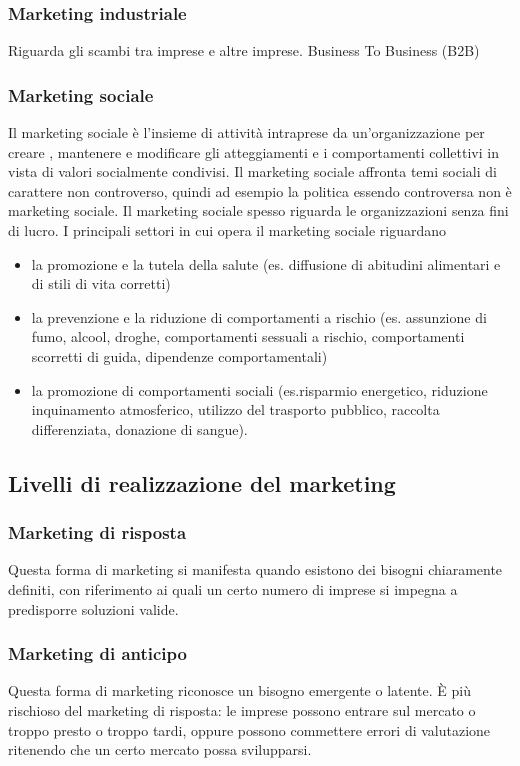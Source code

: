 \subsubsection*{Marketing industriale} 
Riguarda gli scambi tra imprese e altre imprese. Business To Business (B2B)
\subsubsection*{Marketing sociale}
Il marketing sociale è l’insieme di attività intraprese da un’organizzazione per creare , mantenere e modificare gli atteggiamenti e i comportamenti collettivi in vista di valori socialmente condivisi. \newline
Il marketing sociale affronta temi sociali di carattere non controverso, quindi ad esempio la politica essendo controversa non è marketing sociale. \newline
Il marketing sociale spesso riguarda le organizzazioni senza fini di lucro. \newline
I principali settori in cui opera il marketing sociale riguardano
\begin{itemize}
	\item  la promozione e la tutela della salute (es. diffusione di abitudini alimentari e di stili di vita corretti)
	\item  la prevenzione e la riduzione di comportamenti a rischio (es. assunzione di fumo, alcool, droghe, comportamenti sessuali a rischio, comportamenti scorretti di guida, dipendenze comportamentali)
	\item la promozione di comportamenti sociali (es.risparmio energetico, riduzione inquinamento atmosferico, utilizzo del trasporto pubblico, raccolta  differenziata, donazione di sangue).
\end{itemize}

\subsection{Livelli di realizzazione del marketing}
\subsubsection*{Marketing di risposta}
Questa forma di marketing si manifesta quando esistono dei bisogni chiaramente definiti, con riferimento ai quali un certo numero di imprese si impegna a predisporre soluzioni valide.

\subsubsection*{Marketing di anticipo}
Questa forma di marketing riconosce un bisogno emergente o latente. È più rischioso del marketing di risposta: le imprese possono entrare sul mercato o troppo presto o troppo tardi, oppure possono commettere errori di valutazione ritenendo che un certo mercato possa svilupparsi.

